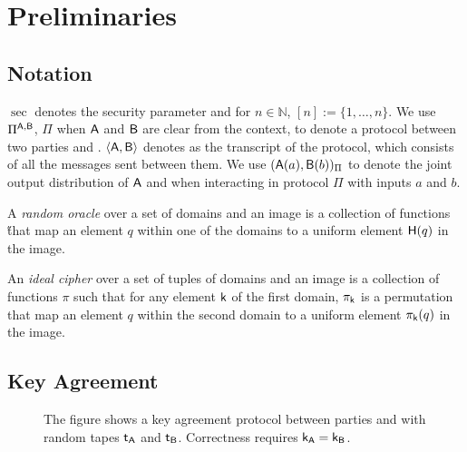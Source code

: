 \section{Preliminaries}

\subsection{Notation}
$\sec$ denotes the security parameter and for $n\in\mathbb N$, $[n]:=\{1,\dots,n\}$. We use $\Pi^{\mathsf{A},\mathsf{B}}$, $\Pi$ when $\mathsf{A}$ and $\mathsf{B}$ are clear from the context,  to denote a protocol between two parties \A and \B. $\langle \mathsf{A},\mathsf{B}\rangle$ denotes as the transcript of the protocol, which consists of all the messages sent between them. We use $(\mathsf{A}(a),\mathsf{B}(b))_{\Pi}$ to denote the joint output distribution of $\mathsf{A}$ and \B when interacting in protocol $\Pi$ with inputs $a$ and $b$.


\begin{definition}
A \emph{random oracle} over a set of domains and an image is a collection of functions \H that map an element $q$ within one of the domains  to a uniform element $\mathsf{H}(q)$ in the image.  
\end{definition}


\begin{definition}
An \emph{ideal cipher} over a set of tuples of domains and an image is a collection of functions $\pi$ such that for any element $\mathsf{k}$ of the first domain, $\pi_\mathsf{k}$ is a permutation that map an element $q$ within the second domain to a uniform element $\pi_{\mathsf{k}}(q)$ in the image.  
\end{definition}

\subsection{Key Agreement}

\begin{figure}
\centering
{}
\label{fig:UKA}
\vspace{-0.3cm}
\caption{The figure shows a key agreement protocol between parties \A and \B with random tapes $\mathsf{t}_\mathsf{A}$ and $\mathsf{t}_\mathsf{B}$. Correctness requires $\mathsf{k}_\mathsf{A}=\mathsf{k}_\mathsf{B}$.}
\end{figure}


